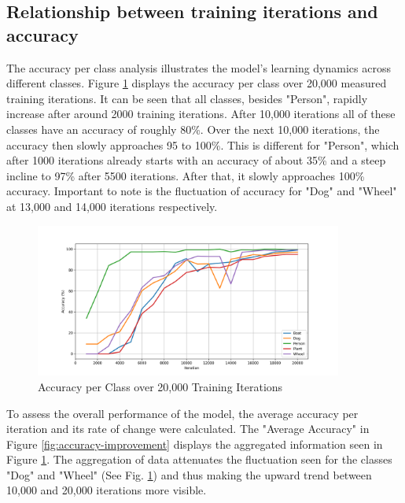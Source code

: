 \subsection{Relationship between training iterations and accuracy}
The accuracy per class analysis illustrates the model's learning dynamics across different classes.
Figure \ref{fig:accuracy-vs-training-iterations} displays the accuracy per class over 20,000 measured training iterations.
It can be seen that all classes, besides "Person", rapidly increase after around 2000 training iterations. After 10,000 iterations
all of these classes have an accuracy of roughly 80\%. Over the next 10,000 iterations, the accuracy then slowly approaches 95 to 100\%.
This is different for "Person", which after 1000 iterations already starts with an accuracy of about 35\% and a steep incline to 97\%
after 5500 iterations. After that, it slowly approaches 100\% accuracy.
Important to note is the fluctuation of accuracy for "Dog" and "Wheel" at 13,000 and 14,000 iterations respectively.\\

\begin{figure}[h]
   \centering
   \includegraphics[width=0.9\textwidth]{../Data/accuracy-graph.png}
   \caption{Accuracy per Class over 20,000 Training Iterations}
   \label{fig:accuracy-vs-training-iterations}
\end{figure}

To assess the overall performance of the model, the average accuracy per iteration and its rate of change were calculated.
The "Average Accuracy" in Figure \ref{fig:accuracy-improvement} displays the aggregated information seen in Figure 
\ref{fig:accuracy-vs-training-iterations}. The aggregation of data attenuates the fluctuation seen for the classes "Dog" and "Wheel" 
(See Fig. \ref{fig:accuracy-vs-training-iterations}) and thus making the upward trend between 10,000 and 20,000 iterations more visible. \\

